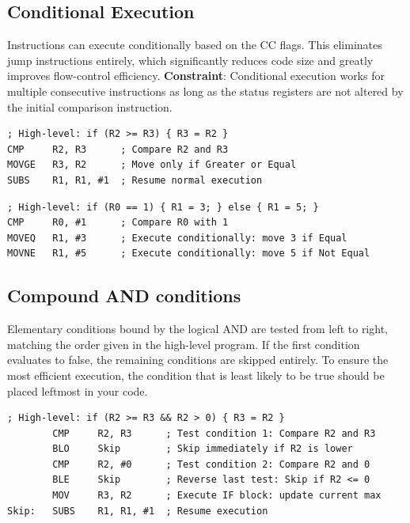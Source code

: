 \documentclass[../comorg-part1.tex]{subfiles}
\begin{document}
\noindent
\begin{minipage}{\textwidth}
\subsection{Conditional Execution}
Instructions can execute conditionally based on the CC flags.\newline
This eliminates jump instructions entirely, which significantly reduces code size and greatly improves flow-control efficiency.\newline
\textbf{Constraint}: Conditional execution works for multiple consecutive instructions as long as the status registers are not altered by the initial comparison instruction.

\begin{lstlisting}[language=ARM, title={Finding Largest Number: Conditional Execution}]
; High-level: if (R2 >= R3) { R3 = R2 }
CMP     R2, R3      ; Compare R2 and R3
MOVGE   R3, R2      ; Move only if Greater or Equal
SUBS    R1, R1, #1  ; Resume normal execution
\end{lstlisting}

\begin{lstlisting}[language=ARM, title={IF-ELSE: Conditional Execution}]
; High-level: if (R0 == 1) { R1 = 3; } else { R1 = 5; }
CMP     R0, #1      ; Compare R0 with 1
MOVEQ   R1, #3      ; Execute conditionally: move 3 if Equal
MOVNE   R1, #5      ; Execute conditionally: move 5 if Not Equal
\end{lstlisting}
\end{minipage}

\subsection{Compound AND conditions}
Elementary conditions bound by the logical AND are tested from left to right, matching the order given in the high-level program.
If the first condition evaluates to false, the remaining conditions are skipped entirely.
To ensure the most efficient execution, the condition that is least likely to be true should be placed leftmost in your code.

\begin{lstlisting}[language=ARM, title={Finding Largest Number: Compound AND}, keepspaces=true]
; High-level: if (R2 >= R3 && R2 > 0) { R3 = R2 }
        CMP     R2, R3      ; Test condition 1: Compare R2 and R3
        BLO     Skip        ; Skip immediately if R2 is lower
        CMP     R2, #0      ; Test condition 2: Compare R2 and 0
        BLE     Skip        ; Reverse last test: Skip if R2 <= 0
        MOV     R3, R2      ; Execute IF block: update current max
Skip:   SUBS    R1, R1, #1  ; Resume execution
\end{lstlisting}
\end{document}
